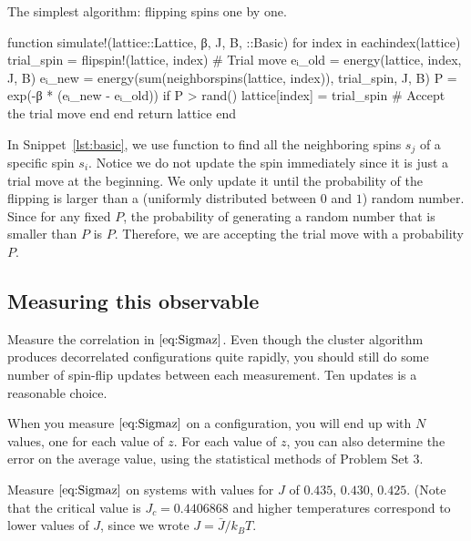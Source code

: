 \begin{algorithm}
    \caption{The simplest algorithm: flipping spins one by one.}
    \label{lst:basic}
    \begin{juliacode}
        function simulate!(lattice::Lattice, β, J, B, ::Basic)
            for index in eachindex(lattice)
                trial_spin = flipspin!(lattice, index)  # Trial move
                eᵢ_old = energy(lattice, index, J, B)
                eᵢ_new = energy(sum(neighborspins(lattice, index)), trial_spin, J, B)
                P = exp(-β * (eᵢ_new - eᵢ_old))
                if P > rand()
                    lattice[index] = trial_spin  # Accept the trial move
                end
            end
            return lattice
        end
    \end{juliacode}
\end{algorithm}

In Snippet~\ref{lst:basic}, we use function  to find all the neighboring
spins \(s_j\) of a specific spin \(s_i\). Notice we do not update the spin immediately
since it is just a trial move at the beginning. We only update it until the probability of
the flipping is larger than a (uniformly distributed between \(0\) and \(1\)) random number.
Since for any fixed \(P\), the probability of generating a random number that is smaller
than \(P\) is \(P\). Therefore, we are accepting the trial move with a probability \(P\).

\subsection{Measuring this observable}

Measure the correlation in \(\eqref{eq:Sigmaz}\). Even
though the cluster algorithm produces decorrelated configurations quite rapidly, you should
still do some number of spin-flip updates between each measurement. Ten updates is a
reasonable choice.

When you measure \(\eqref{eq:Sigmaz}\) on a configuration, you will end up with \(N\)
values, one for each value of \(z\). For each value of \(z\), you can also determine the
error on the average value, using the statistical methods of Problem Set 3.

\Question{} Measure \(\eqref{eq:Sigmaz}\) on systems with values for \(J\) of \(0.435\),
\(0.430\), \(0.425\). (Note that the critical value is \(J_c = 0.4406868\) and higher
temperatures correspond to lower values of \(J\), since we wrote \(J = \bar{J} / k_B T\).

